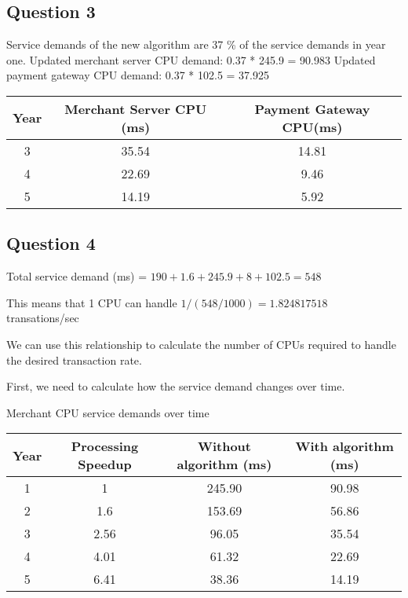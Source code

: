 \subsection{Question 3}
Service demands of the new algorithm are 37 \% of the service demands in year one.
Updated merchant server CPU demand: 0.37 * 245.9 = 90.983
Updated payment gateway CPU demand: 0.37 * 102.5 = 37.925
\begin{center}
  \begin{tabular}{ |c|c|c| }
    \hline
    Year & Merchant Server CPU (ms) & Payment Gateway CPU(ms) \\
    \hline
    3    & 35.54                    & 14.81                   \\
    \hline
    4    & 22.69                    & 9.46                    \\
    \hline
    5    & 14.19                    & 5.92                    \\
    \hline
  \end{tabular}
\end{center}

\subsection{Question 4}

Total service demand (ms) = $190 + 1.6 + 245.9 + 8 + 102.5 = 548$

This means that 1 CPU can handle $1/(548/1000) = 1.824817518$ transations/sec

We can use this relationship to calculate the number of CPUs required to handle the desired transaction rate.

First, we need to calculate how the service demand changes over time.

\begin{center}
  Merchant CPU service demands over time
  \begin{tabular}{ |c|c|c|c| }
    \hline
    Year & Processing Speedup & Without algorithm (ms) & With algorithm (ms) \\
    \hline
    1    & 1                  & 245.90                 & 90.98               \\
    \hline
    2    & 1.6                & 153.69                 & 56.86               \\
    \hline
    3    & 2.56               & 96.05                  & 35.54               \\
    \hline
    4    & 4.01               & 61.32                  & 22.69               \\
    \hline
    5    & 6.41               & 38.36                  & 14.19               \\
    \hline
  \end{tabular}
\end{center}

